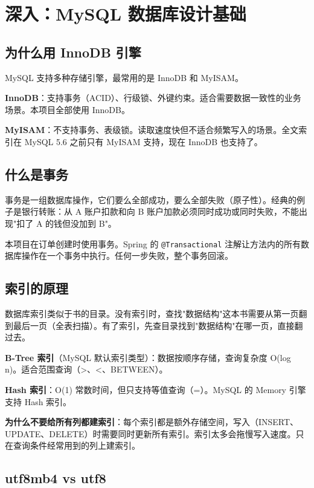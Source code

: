\documentclass[12pt,a4paper]{ctexart}
\begin{document}
\section{深入：MySQL 数据库设计基础}

\subsection{为什么用 InnoDB 引擎}

MySQL 支持多种存储引擎，最常用的是 InnoDB 和 MyISAM。

\textbf{InnoDB}：支持事务（ACID）、行级锁、外键约束。适合需要数据一致性的业务场景。本项目全部使用 InnoDB。

\textbf{MyISAM}：不支持事务、表级锁。读取速度快但不适合频繁写入的场景。全文索引在 MySQL 5.6 之前只有 MyISAM 支持，现在 InnoDB 也支持了。

\subsection{什么是事务}

事务是一组数据库操作，它们要么全部成功，要么全部失败（原子性）。经典的例子是银行转账：从 A 账户扣款和向 B 账户加款必须同时成功或同时失败，不能出现"扣了 A 的钱但没加到 B"。

本项目在订单创建时使用事务。Spring 的 \texttt{@Transactional} 注解让方法内的所有数据库操作在一个事务中执行。任何一步失败，整个事务回滚。

\subsection{索引的原理}

数据库索引类似于书的目录。没有索引时，查找"数据结构"这本书需要从第一页翻到最后一页（全表扫描）。有了索引，先查目录找到"数据结构"在哪一页，直接翻过去。

\textbf{B-Tree 索引}（MySQL 默认索引类型）：数据按顺序存储，查询复杂度 O(log n)。适合范围查询（>、<、BETWEEN）。

\textbf{Hash 索引}：O(1) 常数时间，但只支持等值查询（=）。MySQL 的 Memory 引擎支持 Hash 索引。

\textbf{为什么不要给所有列都建索引}：每个索引都是额外存储空间，写入（INSERT、UPDATE、DELETE）时需要同时更新所有索引。索引太多会拖慢写入速度。只在查询条件经常用到的列上建索引。

\subsection{utf8mb4 vs utf8}
\end{document}

